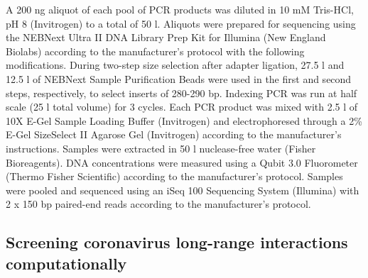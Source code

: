 \documentclass[main.tex]{subfiles}
\begin{document}
A 200 ng aliquot of each pool of PCR products was diluted in 10 mM Tris-HCl, pH 8 (Invitrogen) to a total of 50 \textmu l.
Aliquots were prepared for sequencing using the NEBNext Ultra II DNA Library Prep Kit for Illumina (New England Biolabs) according to the manufacturer's protocol with the following modifications.
During two-step size selection after adapter ligation, 27.5 \textmu l and 12.5 \textmu l of NEBNext Sample Purification Beads were used in the first and second steps, respectively, to select inserts of 280-290 bp.
Indexing PCR was run at half scale (25 \textmu l total volume) for 3 cycles.
Each PCR product was mixed with 2.5 \textmu l of 10X E-Gel Sample Loading Buffer (Invitrogen) and electrophoresed through a 2\% E-Gel SizeSelect II Agarose Gel (Invitrogen) according to the manufacturer's instructions.
Samples were extracted in 50 \textmu l nuclease-free water (Fisher Bioreagents).
DNA concentrations were measured using a Qubit 3.0 Fluorometer (Thermo Fisher Scientific) according to the manufacturer's protocol.
Samples were pooled and sequenced using an iSeq 100 Sequencing System (Illumina) with 2 x 150 bp paired-end reads according to the manufacturer's protocol.


\subsection{Screening coronavirus long-range interactions computationally}
\label{screen_lri_comp}
\end{document}
